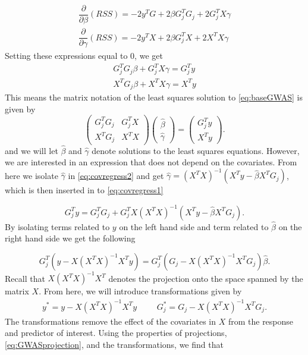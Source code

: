 \begin{align}
	\dfrac{\partial}{\partial \beta} (RSS) = -2y^TG + 2\beta G_j^TG_j + 2G_j^T X\gamma \\
	\dfrac{\partial}{\partial \gamma} (RSS)  = -2y^TX + 2\beta G^T_j X + 2X^TX\gamma 
\end{align}
Setting these expressions equal to $ 0 $, we get
\begin{align}
	G_j^T G_j \beta +  G_j^T X \gamma =  G_j^T y  \label{eq:covregress1}\\ 
	X^T G_j \beta + X^T X \gamma =  X^Ty \label{eq:covregress2}
\end{align}
This means the matrix notation of the least squares solution to \cref{eq:baseGWAS} is given by 
\begin{equation}
	\begin{pmatrix}
		G_j^T G_j & G_j^T X \\
		X^T G_j & X^T X
	\end{pmatrix}
	\begin{pmatrix}
		\hat{\beta} \\
		\hat{\gamma}
	\end{pmatrix} = 
	\begin{pmatrix}
		G_j^T y \\
		X^T y
	\end{pmatrix}.
\end{equation}
and we will let $ \hat{\beta} $ and $ \hat{\gamma} $ denote solutions to the least squares equations. However, we are interested in an expression that does not depend on the covariates. From here we isolate $ \hat{\gamma} $ in \cref{eq:covregress2} and get $ \hat{\gamma} = (X^TX)^{-1}(X^Ty - \hat{\beta} X^TG_j) $, which is then inserted in to \cref{eq:covregress1} 

\begin{equation}
	G^T_j y = G_j^TG_j + G_j^TX (X^TX)^{-1}(X^Ty - \hat{\beta} X^TG_j).
\end{equation}
By isolating terms related to $ y $ on the left hand side and term related to $ \hat{\beta} $ on the right hand side we get the following

\begin{equation} \label{eq:GWASprojection}
	G_j^T(y - X(X^TX)^{-1}X^Ty) = G_j^T(G_j - X(X^TX)^{-1}X^TG_j) \hat{\beta}.
\end{equation}
Recall that $ X(X^TX)^{-1}X^T $ denotes the projection onto the space spanned by the matrix $ X $. From here, we will introduce transformations given by 
\begin{align}
	y^\ast = y - X(X^TX)^{-1}X^Ty & & & G_j^{\ast} = G_j - X(X^TX)^{-1}X^TG_j.
\end{align}
The transformations remove the effect of the covariates in $ X $ from the response and predictor of interest. Using the properties of projections, \cref{eq:GWASprojection}, and the transformations, we find that 

